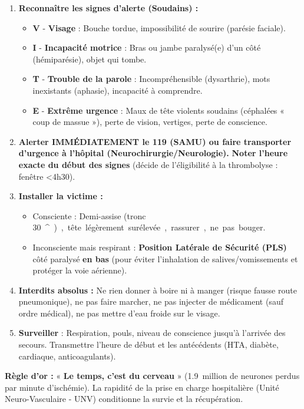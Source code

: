 \documentclass[11pt]{article}
\providecommand{\degree}{^{\circ}}
\begin{document}
\begin{methode}
\begin{enumerate}
\item \textbf{Reconnaître les signes d'alerte (Soudains) :}
    \begin{itemize}
    \item \textbf{V} - \textbf{Visage} : Bouche tordue, impossibilité de sourire (parésie faciale).
    \item \textbf{I} - \textbf{Incapacité motrice} : Bras ou jambe paralysé(e) d'un côté (hémiparésie), objet qui tombe.
    \item \textbf{T} - \textbf{Trouble de la parole} : Incompréhensible (dysarthrie), mots inexistants (aphasie), incapacité à comprendre.
    \item \textbf{E} - \textbf{Extrême urgence} : Maux de tête violents soudains (céphalées « coup de massue »), perte de vision, vertiges, perte de conscience.
    \end{itemize}
\item \textbf{Alerter IMMÉDIATEMENT le 119 (SAMU) ou faire transporter d'urgence à l'hôpital (Neurochirurgie/Neurologie).} \textbf{Noter l'heure exacte du début des signes} (décide de l'éligibilité à la thrombolyse : fenêtre \textless 4h30).
\item \textbf{Installer la victime :}
    \begin{itemize}
    \item Consciente : Demi-assise (tronc \SI{30}{\degree}), tête légèrement surélevée, rassurer, ne pas bouger.
    \item Inconsciente mais respirant : \textbf{Position Latérale de Sécurité (PLS)} côté paralysé \textbf{en bas} (pour éviter l'inhalation de salives/vomissements et protéger la voie aérienne).
    \end{itemize}
\item \textbf{Interdits absolus :} Ne rien donner à boire ni à manger (risque fausse route pneumonique), ne pas faire marcher, ne pas injecter de médicament (sauf ordre médical), ne pas mettre d'eau froide sur le visage.
\item \textbf{Surveiller} : Respiration, pouls, niveau de conscience jusqu'à l'arrivée des secours. Transmettre l'heure de début et les antécédents (HTA, diabète, cardiaque, anticoagulants).
\end{enumerate}
\textbf{Règle d'or :} « \textbf{Le temps, c'est du cerveau} » (\SI{1,9}{million} de neurones perdus par minute d'ischémie). La rapidité de la prise en charge hospitalière (Unité Neuro-Vasculaire - UNV) conditionne la survie et la récupération.
\end{methode}
\end{document}

